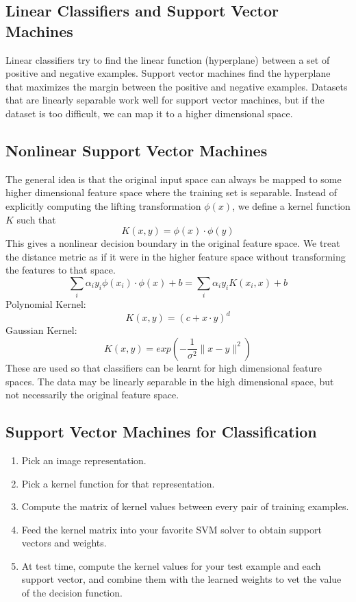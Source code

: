 \documentclass{math}
\begin{document}
\subsection*{Linear Classifiers and Support Vector Machines}
Linear classifiers try to find the linear function (hyperplane) between a set
of positive and negative examples. Support vector machines find the hyperplane
that maximizes the margin between the positive and negative examples. Datasets
that are linearly separable work well for support vector machines, but if the
dataset is too difficult, we can map it to a higher dimensional space.

\subsection*{Nonlinear Support Vector Machines}
The general idea is that the original input space can always be mapped to some
higher dimensional feature space where the training set is separable. Instead of
explicitly computing the lifting transformation \( \phi(x) \), we define a
kernel function \( K \) such that
\[ K(x,y) = \phi(x)\cdot\phi(y) \]
This gives a nonlinear decision boundary in the original feature space. We
treat the distance metric as if it were in the higher feature space without
transforming the features to that space.
\[ \sum_{i}\alpha_iy_i\phi(x_i)\cdot\phi(x)+b = \sum_{i}\alpha_iy_iK(x_i,x)+b \]
Polynomial Kernel:
\[ K(x,y) = (c+x\cdot y)^d \]
Gaussian Kernel:
\[ K(x,y) = exp\left(-\frac{1}{\sigma^2}\|x-y\|^2\right) \]
These are used so that classifiers can be learnt for high dimensional feature
spaces. The data may be linearly separable in the high dimensional space, but
not necessarily the original feature space.

\subsection*{Support Vector Machines for Classification}
\begin{enumerate}
  \item Pick an image representation.
  \item Pick a kernel function for that representation.
  \item Compute the matrix of kernel values between every pair of training
    examples.
  \item Feed the kernel matrix into your favorite SVM solver to obtain support
    vectors and weights.
  \item At test time, compute the kernel values for your test example and each
    support vector, and combine them with the learned weights to vet the value
    of the decision function.
\end{enumerate}
\end{document}
